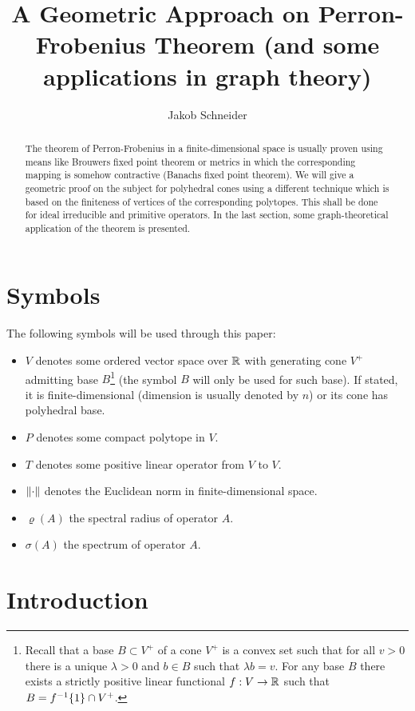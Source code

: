 \documentclass{article}
\title{A Geometric Approach on Perron-Frobenius Theorem (and some applications in graph theory)}
\author{Jakob Schneider}
\begin{document}
\maketitle
\tableofcontents

\begin{abstract}
The theorem of Perron-Frobenius in a finite-dimensional space is usually proven using means like Brouwers fixed point theorem or metrics in which the corresponding mapping is somehow contractive (Banachs fixed point theorem).
We will give a geometric proof on the subject for polyhedral cones using a different technique which is based on the finiteness of vertices of the corresponding polytopes. 
This shall be done for ideal irreducible and primitive operators.
In the last section, some graph-theoretical application of the theorem is presented.
\end{abstract}

\section{Symbols}

The following symbols will be used through this paper:

\begin{itemize}
\item $V$ denotes some ordered vector space over $\mathbb{R}$ with generating cone $V^+$ admitting base $B$\footnote{Recall that a base $B\subset V^+$ of a cone $V^+$ is a convex set such that for all $v>0$ there is a unique $\lambda>0$ and $b\in B$ such that $\lambda b=v$. For any base $B$ there exists a strictly positive linear functional $f:V\to \mathbb{R}$ such that $B=f^{-1}\{1\}\cap V^+$.} (the symbol $B$ will only be used for such base).
If stated, it is finite-dimensional (dimension is usually denoted by $n$) or its cone has polyhedral base.
\item $P$ denotes some compact polytope in $V$.
\item $T$ denotes some positive linear operator from $V$ to $V$.
\item $\left\Vert \cdot \right\Vert$ denotes the Euclidean norm in finite-dimensional space.
\item $\varrho(A)$ the spectral radius of operator $A$.
\item $\sigma(A)$ the spectrum of operator $A$.
\end{itemize}

\section{Introduction}
\end{document}
